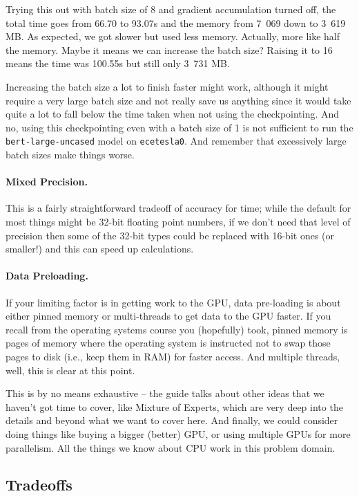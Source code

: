 Trying this out with batch size of 8 and gradient accumulation turned off, the total time goes from 66.70 to 93.07s and the memory from 7~069 down to 3~619 MB. As expected, we got slower but used less memory. Actually, more like half the memory. Maybe it means we can increase the batch size? Raising it to 16 means the time was 100.55s but still only 3~731 MB.

Increasing the batch size a lot to finish faster might work, although it might require a very large batch size and not really save us anything since it would take quite a lot to fall below the time taken when not using the checkpointing. And no, using this checkpointing even with a batch size of 1 is not sufficient to run the \texttt{bert-large-uncased} model on \texttt{ecetesla0}. And remember that excessively large batch sizes make things worse.

\paragraph{Mixed Precision.} This is a fairly straightforward tradeoff of accuracy for time; while the default for most things might be 32-bit floating point numbers, if we don't need that level of precision then some of the 32-bit types could be replaced with 16-bit ones (or smaller!) and this can speed up calculations. 

\paragraph{Data Preloading.} If your limiting factor is in getting work to the GPU, data pre-loading is about either pinned memory or multi-threads to get data to the GPU faster. If you recall from the operating systems course you (hopefully) took, pinned memory is pages of memory where the operating system is instructed not to swap those pages to disk (i.e., keep them in RAM) for faster access. And multiple threads, well, this is clear at this point. 

This is by no means exhaustive -- the guide talks about other ideas that we haven't got time to cover, like Mixture of Experts, which are very deep into the details and beyond what we want to cover here. And finally, we could consider doing things like buying a bigger (better) GPU, or using multiple GPUs for more parallelism. All the things we know about CPU work in this problem domain. 

\subsection*{Tradeoffs}

